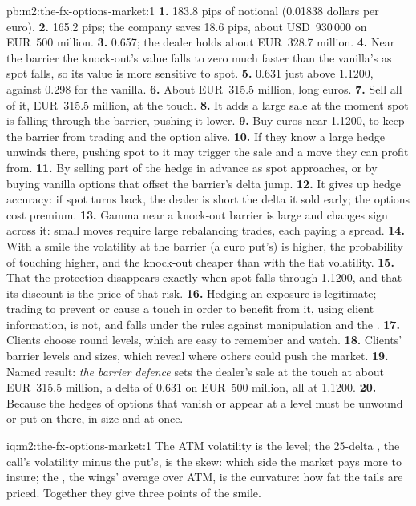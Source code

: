 \begin{solution}{pb:m2:the-fx-options-market:1}
\textbf{1.} 183.8 pips of notional (0.01838 dollars per euro).
\textbf{2.} 165.2 pips; the company saves 18.6 pips, about USD~930\,000 on EUR~500
million.
\textbf{3.} 0.657; the dealer holds about EUR~328.7 million.
\textbf{4.} Near the barrier the knock-out's value falls to zero much faster than
the vanilla's as spot falls, so its value is more sensitive to spot.
\textbf{5.} 0.631 just above 1.1200, against 0.298 for the vanilla.
\textbf{6.} About EUR~315.5 million, long euros.
\textbf{7.} Sell all of it, EUR~315.5 million, at the touch.
\textbf{8.} It adds a large sale at the moment spot is falling through the barrier,
pushing it lower.
\textbf{9.} Buy euros near 1.1200, to keep the barrier from trading and the option
alive.
\textbf{10.} If they know a large hedge unwinds there, pushing spot to it may
trigger the sale and a move they can profit from.
\textbf{11.} By selling part of the hedge in advance as spot approaches, or by
buying vanilla options that offset the barrier's delta jump.
\textbf{12.} It gives up hedge accuracy: if spot turns back, the dealer is short
the delta it sold early; the options cost premium.
\textbf{13.} Gamma near a knock-out barrier is large and changes sign across it:
small moves require large rebalancing trades, each paying a spread.
\textbf{14.} With a smile the volatility at the barrier (a euro put's) is higher,
the probability of touching higher, and the knock-out cheaper than with the flat
volatility.
\textbf{15.} That the protection disappears exactly when spot falls through 1.1200,
and that its discount is the price of that risk.
\textbf{16.} Hedging an exposure is legitimate; trading to prevent or cause a
touch in order to benefit from it, using client information, is not, and falls
under the rules against manipulation and the .
\textbf{17.} Clients choose round levels, which are easy to remember and watch.
\textbf{18.} Clients' barrier levels and sizes, which reveal where others could push
the market.
\textbf{19.} Named result: \emph{the barrier defence} sets the dealer's sale at the
touch at about EUR~315.5 million, a delta of 0.631 on EUR~500 million, all at
1.1200.
\textbf{20.} Because the hedges of options that vanish or appear at a level must be
unwound or put on there, in size and at once.
\end{solution}

\begin{solution}{iq:m2:the-fx-options-market:1}
The ATM volatility is the level; the 25-delta , the call's volatility
minus the put's, is the skew: which side the market pays more to insure; the
, the wings' average over ATM, is the curvature: how fat the tails are
priced. Together they give three points of the smile.
\end{solution}

